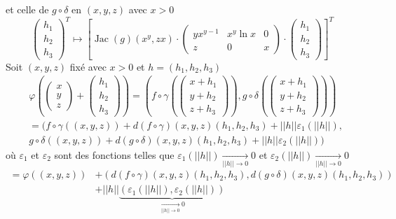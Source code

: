 \documentclass{fancybook}
\begin{document}
et celle de $g\circ \delta$ en $(x,y,z)$ avec $x>0$
$$ \begin{pmatrix}
h_1 \\
h_2 \\
h_3
\end{pmatrix}^T \mapsto \left[\operatorname{Jac}(g)(x^y,zx) \cdot \begin{pmatrix}
yx^{y-1} & x^y\ln x & 0 \\
z & 0 & x
\end{pmatrix}\cdot \begin{pmatrix}
h_1 \\
h_2 \\
h_3
\end{pmatrix}\right]^T $$
Soit $(x,y,z)$ fixé avec $x>0$ et $h=(h_1,h_2,h_3)$ $$\begin{aligned} &\varphi\left( \begin{pmatrix} x \\y \\z \end{pmatrix} + \begin{pmatrix} h_1 \\ h_2 \\ h_3\end{pmatrix}\right) = \left( f\circ \gamma\left(\begin{pmatrix} x+h_1 \\y+h_2 \\z+h_3 \end{pmatrix}\right), g\circ \delta\left(\begin{pmatrix} x+h_1 \\y+h_2 \\z+h_3 \end{pmatrix}\right) \right)\\
&= (f\circ \gamma \left( (x,y,z)\right) + d(f\circ \gamma)\left(x,y,z\right) \left( h_1 , h_2 , h_3\right)+ ||h||\varepsilon_1(||h||),\\ 
&g\circ \delta \left( (x,y,z)\right) + d(g\circ \delta)\left(x,y,z\right) \left( h_1 , h_2 , h_3\right)+ ||h||\varepsilon_2(||h||)) \end{aligned}$$
où $\varepsilon_1$ et $\varepsilon_2$ sont des fonctions telles que $\varepsilon_1(||h||) \xrightarrow[||h||\to 0]{}0$ et $\varepsilon_2(||h||) \xrightarrow[||h||\to 0]{}0$
$$\begin{aligned}
=\varphi((x,y,z)) &+ (d(f\circ \gamma)\left(x,y,z\right) \left( h_1 , h_2 , h_3\right),d(g\circ \delta)\left(x,y,z\right) \left( h_1 , h_2 , h_3\right))\\
&+ ||h||\underbrace{(\varepsilon_1(||h||),\varepsilon_2(||h||))}_{\xrightarrow[||h||\to 0]{}0}
\end{aligned} $$
\end{document}

